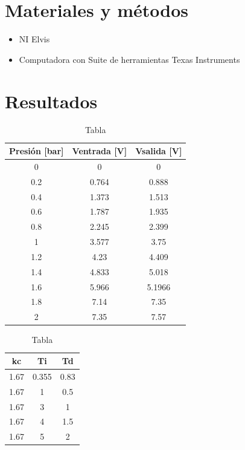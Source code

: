\documentclass[]{article}
\begin{document}
\section{Materiales y métodos}

	\begin{itemize}
		\item NI Elvis
		\item Computadora con Suite de herramientas Texas Instruments
	\end{itemize}
	
\section{Resultados}



\begin{table}[h!]
	\centering
	\begin{tabular}{|c|c|c|}
		\hline
		Presión {[}bar{]} & Ventrada {[}V{]} & Vsalida {[}V{]} \\ \hline
		0                 & 0                & 0               \\ \hline
		0.2               & 0.764            & 0.888           \\ \hline
		0.4               & 1.373            & 1.513           \\ \hline
		0.6               & 1.787            & 1.935           \\ \hline
		0.8               & 2.245            & 2.399           \\ \hline
		1                 & 3.577            & 3.75            \\ \hline
		1.2               & 4.23             & 4.409           \\ \hline
		1.4               & 4.833            & 5.018           \\ \hline
		1.6               & 5.966            & 5.1966          \\ \hline
		1.8               & 7.14             & 7.35            \\ \hline
		2                 & 7.35             & 7.57            \\ \hline
	\end{tabular}
	\caption{Tabla}
\end{table}


\begin{table}[h!]
	\centering
	\begin{tabular}{|c|c|c|}
		\hline
		kc   & Ti    & Td   \\ \hline
		1.67 & 0.355 & 0.83 \\ \hline
		1.67 & 1     & 0.5  \\ \hline
		1.67 & 3     & 1    \\ \hline
		1.67 & 4     & 1.5  \\ \hline
		1.67 & 5     & 2    \\ \hline
	\end{tabular}
	\caption{Tabla}
\end{table}
\end{document}
